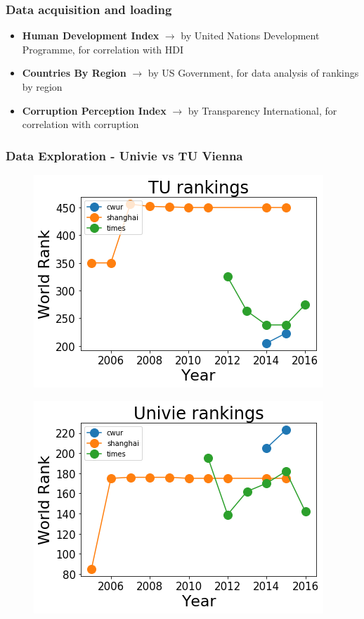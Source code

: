 \documentclass[mathserif,notheorems,11pt]{beamer}
\begin{document}
\begin{frame}
\frametitle{Data acquisition and loading}
\begin{itemize}
	\item \textbf{Human Development Index} $\rightarrow$  by United Nations Development Programme, for correlation with HDI
\item \textbf{Countries By Region}  $\rightarrow$  by US Government, for data analysis of rankings by region
\item \textbf{Corruption Perception Index} $\rightarrow$  by Transparency International, for correlation with corruption
\end{itemize}

\end{frame}


\begin{frame}
\frametitle{Data Exploration - Univie vs TU Vienna}
\begin{figure}
	\centering
	\includegraphics[width=0.45\linewidth]{graphs/tu_univie_rank_graph}
	
\end{figure}
\begin{figure}
	\centering
	\includegraphics[width=0.45\linewidth]{graphs/tu_rank_graph}
	
\end{figure}



\end{frame}
\end{document}
